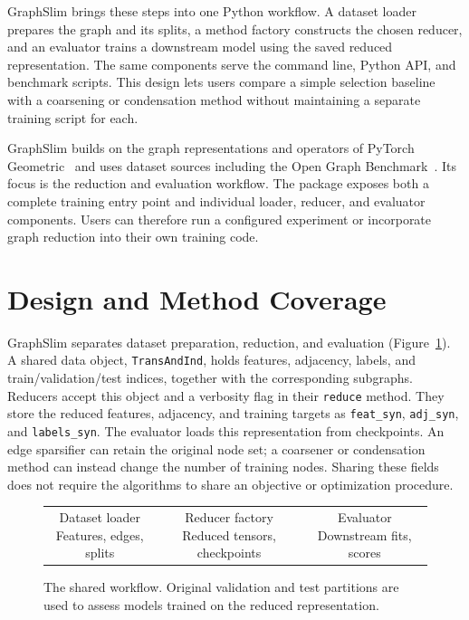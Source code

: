 \documentclass[twoside,11pt]{article}
\begin{document}
GraphSlim brings these steps into one Python workflow. A dataset loader prepares
the graph and its splits, a method factory constructs the chosen reducer, and an
evaluator trains a downstream model using the saved reduced representation.
The same components serve the command line, Python API, and benchmark scripts.
This design lets users compare a simple selection baseline with a coarsening or
condensation method without maintaining a separate training script for each.

GraphSlim builds on the graph representations and operators of PyTorch
Geometric~\citep{fey2019fast} and uses dataset sources including the Open Graph
Benchmark~\citep{hu2020ogb}. Its focus is the reduction and evaluation workflow.
The package exposes both a complete training entry point and individual loader,
reducer, and evaluator components. Users can therefore run a configured
experiment or incorporate graph reduction into their own training code.

\section{Design and Method Coverage}

GraphSlim separates dataset preparation, reduction, and evaluation
(Figure~\ref{fig:workflow}). A shared data object, \texttt{TransAndInd}, holds features,
adjacency, labels, and train/validation/test indices, together with the
corresponding subgraphs. Reducers accept this object and a verbosity flag in their
\texttt{reduce} method. They store
the reduced features, adjacency, and training targets as \texttt{feat\_syn},
\texttt{adj\_syn}, and \texttt{labels\_syn}. The evaluator loads this representation
from checkpoints. An edge sparsifier can retain the original node set; a
coarsener or condensation method can instead change the number of training
nodes. Sharing these fields does not require the algorithms to share an
objective or optimization procedure.

\begin{figure}[htbp]
\centering
\begin{tabular}{c@{\quad$\longrightarrow$\quad}c@{\quad$\longrightarrow$\quad}c}
\fbox{\parbox[c]{0.24\linewidth}{\centering Dataset loader\\Features, edges, splits}} &
\fbox{\parbox[c]{0.24\linewidth}{\centering Reducer factory\\Reduced tensors, checkpoints}} &
\fbox{\parbox[c]{0.24\linewidth}{\centering Evaluator\\Downstream fits, scores}}
\end{tabular}
\caption{The shared workflow. Original validation and test partitions are used
to assess models trained on the reduced representation.}
\label{fig:workflow}
\end{figure}
\end{document}
